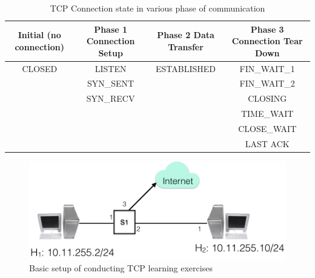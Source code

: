 \begin{table}[!ht]
\centering
\caption{TCP Connection state in various phase of communication}\label{chap3-tab1}
\smallskip
\renewcommand{\arraystretch}{1.4}
\begin{tabular}{|c|c|c|c|}
\hline
\textbf{Initial (no connection)} & \textbf{Phase 1 Connection Setup} & \textbf{Phase 2 Data Transfer} & {\bf Phase 3 Connection Tear Down}\\
\hline
CLOSED & LISTEN & ESTABLISHED & FIN\_WAIT\_1\\
       & SYN\_SENT & & FIN\_WAIT\_2\\
       & SYN\_RECV & & CLOSING\\
       &          & & TIME\_WAIT\\
       &          & & CLOSE\_WAIT\\
       &          & & LAST ACK\\
\hline
\end{tabular}
\end{table}

\begin{figure}[!htb]
\centering
\includegraphics[scale=.43]{src/Figures/chap3/1.jpg}
\caption{Basic setup of conducting TCP learning exercises}\label{chap3-fig1}
\end{figure}

